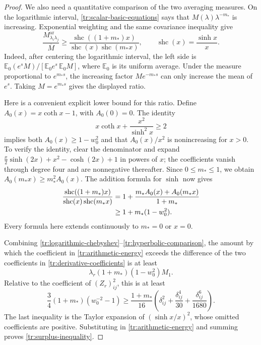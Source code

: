 \documentclass[11pt]{article}
\theoremstyle{definition}
\theoremstyle{remark}
\numberwithin{equation}{section}
\begin{document}
\begin{proof}
We also need a quantitative comparison of the two averaging measures.
On the logarithmic interval, \eqref{tr:scalar-basic-equations} says
that $M(\lambda)\lambda^{-m_*}$ is increasing.  Exponential weighting
and the same covariance inequality give
\begin{equation}\label{tr:average-comparison}
 \frac{M^{\mathrm{ar}}_{\lambda_i\lambda_j}}{\overline M}
 \ge\frac{\operatorname{shc}((1+m_*)x)}
          {\operatorname{shc}(x)\operatorname{shc}(m_*x)},
 \qquad \operatorname{shc}(x)=\frac{\sinh x}{x}.
\end{equation}
Indeed, after centering the logarithmic interval, the left side is
$\mathbb E_0(e^sM)/[\mathbb E_0e^s\,\mathbb E_0M]$, where
$\mathbb E_0$ is its uniform average.  Under the measure proportional
to $e^{m_*s}$, the increasing factor $Me^{-m_*s}$ can only increase
the mean of $e^s$.  Taking $M=e^{m_*s}$ gives the displayed ratio.

Here is a convenient explicit lower bound for this ratio.  Define
$A_0(x)=x\coth x-1$, with $A_0(0)=0$.  The identity
\[
 x\coth x+\frac{x^2}{\sinh^2x}\ge2
\]
implies both $A_0(x)\ge1-w_0^2$ and that $A_0(x)/x^2$ is
nonincreasing for $x>0$.  To verify the identity, clear the denominator
and expand
$\tfrac{x}{2}\sinh(2x)+x^2-\cosh(2x)+1$ in powers of $x$;
the coefficients vanish through degree four and are nonnegative
thereafter.  Since $0\le m_*\le1$, we obtain
$A_0(m_*x)\ge m_*^2A_0(x)$.  The addition formula for $\sinh$ now gives
\begin{align}
 \frac{\operatorname{shc}((1+m_*)x)}
          {\operatorname{shc}(x)\operatorname{shc}(m_*x)}
 &=1+\frac{m_*A_0(x)+A_0(m_*x)}{1+m_*}\notag\\
 &\ge1+m_*(1-w_0^2).
 \label{tr:hyperbolic-comparison}
\end{align}
Every formula here extends continuously to $m_*=0$ or $x=0$.

Combining \eqref{tr:logarithmic-chebyshev}--\eqref{tr:hyperbolic-comparison},
the amount by which the coefficient in
\eqref{tr:arithmetic-energy} exceeds the difference of the two
coefficients in \eqref{tr:derivative-coefficients} is at least
\[
 \lambda_r(1+m_*)(1-w_0^2)M_1.
\]
Relative to the coefficient of $(Z_r)_{ij}^2$, this is at least
\[
 \frac34(1+m_*)(w_0^{-2}-1)
 \ge\frac{1+m_*}{16}
    \left(\delta_{ij}^2+\frac{\delta_{ij}^4}{30}
                            +\frac{\delta_{ij}^6}{1680}\right).
\]
The last inequality is the Taylor expansion of
$(\sinh x/x)^2$, whose omitted coefficients are positive.
Substituting in \eqref{tr:arithmetic-energy} and summing proves
\eqref{tr:surplus-inequality}.
\end{proof}
\end{document}
